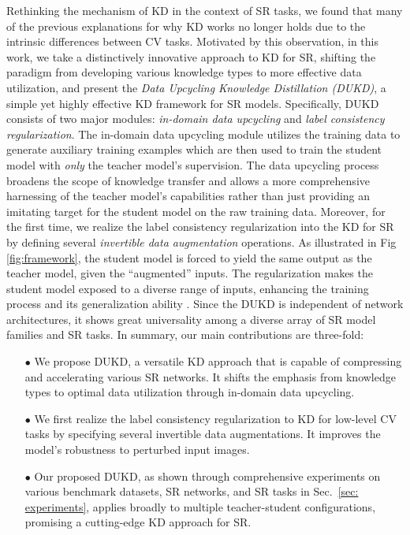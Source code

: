 \documentclass[10pt,twocolumn,letterpaper]{article}
\begin{document}
Rethinking the mechanism of KD in the context of SR tasks, we found that many of the previous explanations for why KD works no longer holds due to the intrinsic differences between CV tasks. Motivated by this observation, in this work, we take a distinctively innovative approach to KD for SR, shifting the paradigm from developing various knowledge types \cite{gou2021knowledge} to more effective data utilization, and present the \textit{Data Upcycling Knowledge Distillation (DUKD)}, a simple yet highly effective KD framework for SR models. 
Specifically, DUKD consists of two major modules: \textit{in-domain data upcycling} and \textit{label consistency regularization}. The in-domain data upcycling module utilizes the training data to generate auxiliary training examples which are then used to train the student model with \textit{only} the teacher model's supervision. The data upcycling process broadens the scope of knowledge transfer and allows a more comprehensive harnessing of the teacher model's capabilities rather than just providing an imitating target for the student model on the raw training data. Moreover, for the first time, we realize the label consistency regularization into the KD for SR by defining several \textit{invertible data augmentation} operations. As illustrated in Fig \ref{fig:framework}, the student model is forced to yield the same output as the teacher model, given the ``augmented'' inputs. The regularization makes the student model exposed to a diverse range of inputs, enhancing the training process and its generalization ability \cite{oliver2018realistic, jeong2019consistency, englesson2021consistency}.
Since the DUKD is independent of network architectures, it shows great universality among a diverse array of SR model families and SR tasks.
In summary, our main contributions are three-fold:
\begin{itemize}
	\item[$\bullet$] We propose DUKD, a versatile KD approach that is capable of compressing and accelerating various SR networks. It shifts the emphasis from knowledge types to optimal data utilization through in-domain data upcycling. \item[$\bullet$] We first realize the label consistency regularization to KD for low-level CV tasks by specifying several invertible data augmentations. It improves the model's robustness to perturbed input images.
	\item[$\bullet$] Our proposed DUKD, as shown through comprehensive experiments on various benchmark datasets, SR networks, and SR tasks in Sec.~\ref{sec: experiments}, applies broadly to multiple teacher-student configurations, promising a cutting-edge KD approach for SR. \end{itemize}
\end{document}
